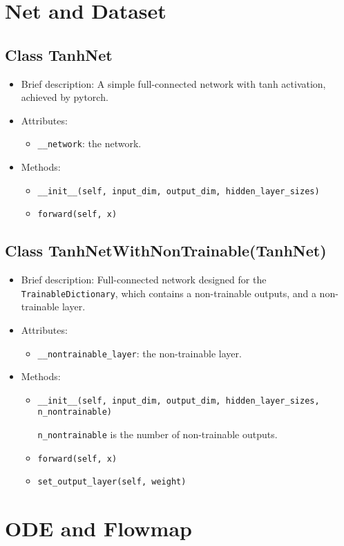 \documentclass[en, bibend=bibtex]{elegantpaper}
\theoremstyle{plain}
\begin{document}
\section{Net and Dataset}

\subsection{Class TanhNet}

\begin{itemize}
\item Brief description: A simple full-connected network with tanh activation,
  achieved by pytorch.
\item Attributes:
  \begin{itemize}
  \item \lstinline|__network|: the network.
  \end{itemize}
\item Methods:
  \begin{itemize}
  \item \lstinline|__init__(self, input_dim, output_dim, hidden_layer_sizes)|
  \item \lstinline|forward(self, x)|
  \end{itemize}
\end{itemize}

\subsection{Class TanhNetWithNonTrainable(TanhNet)}

\begin{itemize}
\item Brief description: Full-connected network designed for the 
  \lstinline|TrainableDictionary|,
  which contains a non-trainable outputs,
  and a non-trainable layer.
\item Attributes:
  \begin{itemize}
  \item \lstinline|__nontrainable_layer|: the non-trainable layer.
  \end{itemize}
\item Methods:
  \begin{itemize}
  \item \lstinline|__init__(self, input_dim, output_dim, hidden_layer_sizes, n_nontrainable)|

    \lstinline|n_nontrainable| is the number of non-trainable outputs.
  \item \lstinline|forward(self, x)|
  \item \lstinline|set_output_layer(self, weight)|
  \end{itemize}
\end{itemize}

\section{ODE and Flowmap}
\end{document}
